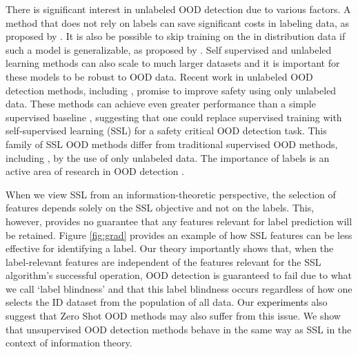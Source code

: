 \documentclass{article} %
\theoremstyle{plain}
\theoremstyle{definition}
\theoremstyle{remark}
\begin{document}
There is significant interest in unlabeled OOD detection due to various factors. A method that does not rely on labels can save significant costs in labeling data, as proposed by \citep{sehwag2021ssd}. It is also be possible to skip training on the in distribution data if such a model is generalizable, as proposed by \citep{wang2023clipn}. Self supervised and unlabeled learning methods can also scale to much larger datasets and it is important for these models to be robust to OOD data. Recent work in unlabeled OOD detection methods, including \citep{sehwag2021ssd, tack2020csi, liu2023unsupervised, guille2024cadet, wang2023clipn}, promise to improve safety using only unlabeled data. These methods can achieve even greater performance than a simple supervised baseline \citep{hendrycks2016baseline}, suggesting that one could replace supervised training with self-supervised learning (SSL) for a safety critical OOD detection task. This family of SSL OOD methods differ from traditional supervised OOD methods, including \citep{fort2021exploring}, by the use of only unlabeled data. The importance of labels is an active area of research in OOD detection \citep{du2024does, du2024and}. 


When we view SSL from an information-theoretic perspective, the selection of features depends solely on the SSL objective and not on the labels. This, however, provides no guarantee that any features relevant for label prediction will be retained. Figure \ref{fig:grad} provides an example of how SSL features can be less effective for identifying a label. Our theory importantly shows that, when the label-relevant features are independent of the features relevant for the SSL algorithm's successful operation, OOD detection is guaranteed to fail due to what we call `label blindness' and that this label blindness occurs regardless of how one selects the ID dataset from the population of all data. Our \textcolor{black}{experiments} also suggest that Zero Shot OOD methods \citep{wang2023clipn, esmaeilpour2022zero} may also suffer from this issue. We show that unsupervised OOD detection methods behave in the same way as SSL in the context of information theory.
\end{document}
